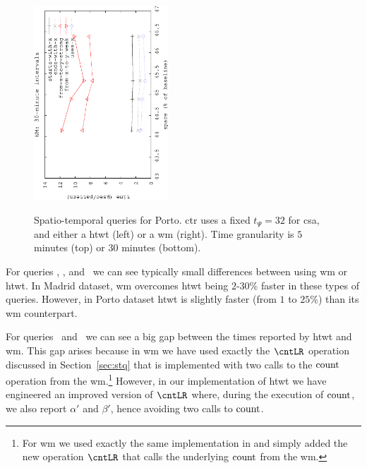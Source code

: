 \begin{figure}[!ht]
\begin{center}
			{\includegraphics[angle=-90,width=0.45\textwidth]{figures_synt/porto_wm30.eps}}
			
			
			
		\end{center}
		\vspace{-0.3cm}
		\caption{Spatio-temporal queries for Porto. \acrshort{ctr} uses a fixed $t_{\Psi}=32$ for \acrlong{csa}, 
			and either a \acrlong{htwt} (left) or a \acrlong{wm} (right). 
			Time granularity is $5$ minutes (top) or $30$ minutes (bottom). 
		}
		\label{fig:portost}
	\end{figure}





	For queries \Tswx, \Tewx, and \Tux\ we can see typically small differences between using \gls{wm} or \gls{htwt}. In 
	Madrid dataset, \gls{wm} overcomes \gls{htwt} being $2$-$30$\% faster in these types of queries. 
	However, in Porto dataset \gls{htwt} is slightly 
	faster (from $1$ to $25$\%) than its \gls{wm} counterpart.

	For queries \Tfxtys\ and \Tfxtyw\ we can see a big gap between the times reported by \gls{htwt} and \gls{wm}.
	This gap arises because in \gls{wm} we have used exactly the $\cntLR$ operation discussed in Section~\ref{sec:stq}
	that is implemented with two calls to the $\operatorname{count}$ operation from the \gls{wm}.\footnote{For \gls{wm} we used exactly the same 
		implementation in \cite{CNO15} and simply added the new operation $\cntLR$ that calls the underlying $\operatorname{count}$ from the
		\gls{wm}. }  
	However, in our implementation of
	\gls{htwt} we have engineered an improved version of $\cntLR$ where, during the execution of $\operatorname{count}$, we also report
	$\alpha'$ and  $\beta'$, hence avoiding two calls to $\operatorname{count}$.
	 
